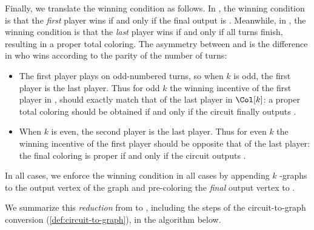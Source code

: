 Finally, we translate the winning condition as follows.  In \CircSat[k], the
winning condition is that the \emph{first} player wins if and only if the final
output is \True.  Meanwhile, in \Col[k], the winning condition is that the
\emph{last} player wins if and only if all turns finish, resulting in a proper
total coloring.  The asymmetry between \CircSat[k] and \Col[k] is the difference
in who wins according to the parity of the number of turns:
\begin{itemize}

  \item The first player plays on odd-numbered turns, so when \(k\) is odd, the
    first player is the last player.  Thus for odd \(k\) the winning incentive
    of the first player in \CircSat[k], should exactly match that of the last
    player in \(\Col[k]\): a proper total coloring should be obtained if and
    only if the circuit finally outputs \True.

  \item When \(k\) is even, the second player is the last player.  Thus for even
    \(k\) the winning incentive of the first player should be opposite that of
    the last player: the final coloring is proper if and only if the circuit
    outputs \False.

\end{itemize}
In all cases, we enforce the winning condition in all cases by appending \(k\)
\NOT-graphs to the output vertex of the graph and pre-coloring the \emph{final}
output vertex to \False.


We summarize this \emph{reduction} from \CircSat[k] to \Col[k], including the
steps of the circuit-to-graph conversion (\cref{def:circuit-to-graph}), in the
algorithm below.

